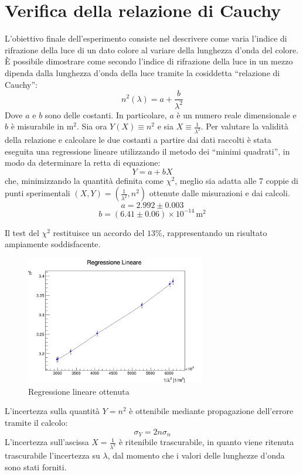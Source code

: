 \documentclass[a4paper,12pt]{article}
\begin{document}
\section{Verifica della relazione di Cauchy}
L’obiettivo finale dell’esperimento consiste nel descrivere come varia l’indice di rifrazione della luce di un dato colore al variare della lunghezza d’onda del colore. 
È possibile dimostrare come secondo l’indice di rifrazione della luce in un mezzo dipenda dalla lunghezza d’onda della luce tramite la cosiddetta “relazione di Cauchy”:
\[
n^2(\lambda) = a + \frac{b}{\lambda^2}
\]
Dove \( a \) e \( b \) sono delle costanti. In particolare, \( a \) è un numero reale dimensionale e \( b \) è misurabile in \( \text{m}^2 \). 
Sia ora \( Y(X) \equiv n^2 \) e sia \( X \equiv \frac{1}{\lambda^2} \).
Per valutare la validità della relazione e calcolare le due costanti a partire dai dati raccolti è stata eseguita una regressione lineare utilizzando il metodo dei “minimi quadrati”, in modo da determinare la retta di equazione:
\[
Y = a + bX
\]
che, minimizzando la quantità definita come \( \chi^2 \), meglio sia adatta alle 7 coppie di punti sperimentali \( (X, Y) = \left(\frac{1}{\lambda^2}, n^2\right) \) ottenute dalle misurazioni e dai calcoli.
\[
a = 2.992 \pm 0.003
\]
\[
b = (6.41 \pm 0.06) \times 10^{-14} \, \text{m}^2
\]

Il test del \( \chi^2 \) restituisce un accordo del \( 13\% \), rappresentando un risultato ampiamente soddisfacente.

\begin{figure}[H]
    \centering
    \includegraphics[width=0.7\textwidth]{image.png}
    \caption{Regressione lineare ottenuta}
    \label{fig:regressione}
\end{figure}

L’incertezza sulla quantità \( Y = n^2 \) è ottenibile mediante propagazione dell’errore tramite il calcolo:
\[
\sigma_Y = 2n \sigma_n
\]
L’incertezza sull’ascissa \( X = \frac{1}{\lambda^2} \) è ritenibile trascurabile, in quanto viene ritenuta trascurabile l’incertezza su \( \lambda \), dal momento che i valori delle lunghezze d’onda sono stati forniti.
\end{document}
